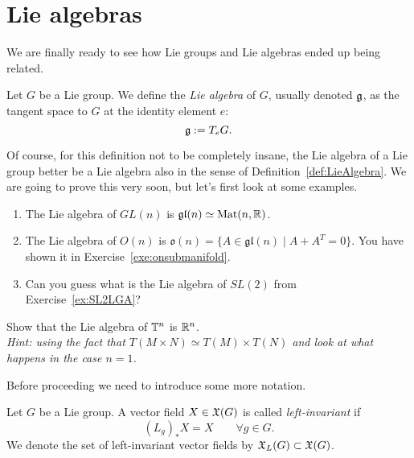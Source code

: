 \section{Lie algebras}

We are finally ready to see how Lie groups and Lie algebras ended up being related.

\begin{definition}
	Let $G$ be a Lie group.
	We define the \emph{Lie algebra} of $G$, usually denoted $\mathfrak{g}$, as the tangent space to $G$ at the identity element $e$:
	\begin{equation}
		\mathfrak{g} := T_e G.
	\end{equation}
\end{definition}

Of course, for this definition not to be completely insane, the Lie algebra of a Lie group better be a Lie algebra also in the sense of Definition~\ref{def:LieAlgebra}.
We are going to prove this very soon, but let's first look at some examples.

\begin{example}
	\begin{enumerate}
		\item The Lie algebra of $GL(n)$ is $\mathfrak{gl}(n)\simeq \mathrm{Mat}(n, \mathbb{R})$.
		\item The Lie algebra of $O(n)$ is $\mathfrak{o}(n) = \{A \in \mathfrak{gl}(n) \mid A+A^T = 0\}$. You have shown it in Exercise~\ref{exe:onsubmanifold}.
		\item Can you guess what is the Lie algebra of $SL(2)$ from Exercise~\ref{ex:SL2LGA}?
	\end{enumerate}
\end{example}

\begin{exercise}
	Show that the Lie algebra of $\mathbb{T}^n$ is $\mathbb{R}^n$.\\
	\textit{\small Hint: using the fact that $T(M\times N) \simeq T(M)\times T(N)$ and look at what happens in the case $n=1$.}
\end{exercise}

Before proceeding we need to introduce some more notation.

\begin{definition}
	Let $G$ be a Lie group.
	A vector field $X\in\mathfrak{X}(G)$ is called \emph{left-invariant} if
	\begin{equation}
		(L_g)_*X = X \qquad \forall g\in G.
	\end{equation}
	We denote the set of left-invariant vector fields by $\mathfrak{X}_L(G)\subset \mathfrak{X}(G)$.
\end{definition}

